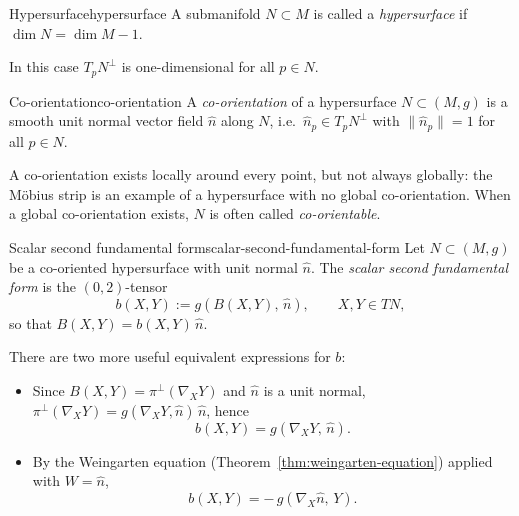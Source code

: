 
\begin{colordef}{Hypersurface}{hypersurface}
A submanifold $N \subset M$ is called a \emph{hypersurface} if $\dim N = \dim M - 1$. 
\end{colordef}
In this case $T_p N^\perp$ is one-dimensional for all $p \in N$.

\begin{colordef}{Co-orientation}{co-orientation}
A \emph{co-orientation} of a hypersurface $N \subset (M, g)$ is a smooth unit normal vector field $\hat n$ along $N$, i.e.\ $\hat n_p \in T_p N^\perp$ with $\|\hat n_p\| = 1$ for all $p \in N$.
\end{colordef}

\begin{colremark}{}{}
A co-orientation exists locally around every point, but not always globally: the Möbius strip is an example of a hypersurface with no global co-orientation. When a global co-orientation exists, $N$ is often called \emph{co-orientable}.
\end{colremark}

\begin{colordef}{Scalar second fundamental form}{scalar-second-fundamental-form}
Let $N \subset (M, g)$ be a co-oriented hypersurface with unit normal $\hat n$. The \emph{scalar second fundamental form} is the $(0, 2)$-tensor
\[
b(X, Y) := g(B(X, Y),\, \hat n), \qquad X, Y \in TN,
\]
so that $B(X, Y) = b(X, Y)\, \hat n$.
\end{colordef}

There are two more useful equivalent expressions for $b$:
\begin{itemize}
    \item Since $B(X, Y) = \pi^\perp(\nabla_X Y)$ and $\hat n$ is a unit normal, $\pi^\perp(\nabla_X Y) = g(\nabla_X Y, \hat n)\, \hat n$, hence
    \[
    b(X, Y) = g(\nabla_X Y,\, \hat n).
    \]
    \item By the Weingarten equation (Theorem~\ref{thm:weingarten-equation}) applied with $W = \hat n$,
    \begin{equation}
        \label{eq:alternative_scalar_2nd_fund_form}
        b(X, Y) = -\,g(\nabla_X \hat n,\, Y).
    \end{equation}
\end{itemize}





